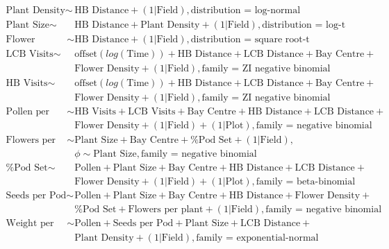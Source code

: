 \documentclass[12pt]{article} %
\begin{document}
\begin{align*}
    \text{Plant Density} \sim & \text{HB Distance} + (1|\text{Field}), \text{distribution = log-normal} \\
    \text{Plant Size} \sim & \text{HB Distance} + \text{Plant Density} + (1|\text{Field}) ,\text{distribution = log-t} \\
    \text{Flower Density} \sim & \text{HB Distance} + (1|\text{Field}), \text{distribution = square root-t} \\
    \text{LCB Visits} \sim & \text{offset}(log(\text{Time})) + \text{HB Distance} + \text{LCB Distance} + \text{Bay Centre} + \\
    &   \text{Flower Density} + (1|\text{Field}), \text{family = ZI negative binomial} \\
    \text{HB Visits} \sim & \text{offset}(log(\text{Time})) + \text{HB Distance} + \text{LCB Distance} + \text{Bay Centre} + \\
    &   \text{Flower Density} + (1|\text{Field}), \text{family = ZI negative binomial} \\
    \text{Pollen per Stigma} \sim & \text{HB Visits} + \text{LCB Visits} + \text{Bay Centre} + \text{HB Distance} + \text{LCB Distance} +\\
    &   \text{Flower Density} + (1|\text{Field}) + (1|\text{Plot}), \text{family = negative binomial} \\
    \text{Flowers per Plant} \sim & \text{Plant Size} + \text{Bay Centre} + \text{\% Pod Set} + (1|\text{Field}),\\
    &   \phi \sim \text{Plant Size}, \text{family = negative binomial} \\
    \text{\% Pod Set} \sim & \text{Pollen} + \text{Plant Size} + \text{Bay Centre} + \text{HB Distance} + \text{LCB Distance} + \\
    &   \text{Flower Density} + (1|\text{Field}) + (1|\text{Plot}), \text{family = beta-binomial} \\
    \text{Seeds per Pod} \sim & \text{Pollen} + \text{Plant Size} + \text{Bay Centre} + \text{HB Distance} + \text{Flower Density} +\\
    &   \text{\% Pod Set} + \text{Flowers per plant} + (1|\text{Field}), \text{family = negative binomial} \\
    \text{Weight per Seed} \sim & \text{Pollen} + \text{Seeds per Pod} + \text{Plant Size} + \text{LCB Distance} +\\
    &   \text{Plant Density} + (1|\text{Field}), \text{family = exponential-normal}\\
\end{align*}
\end{document}

